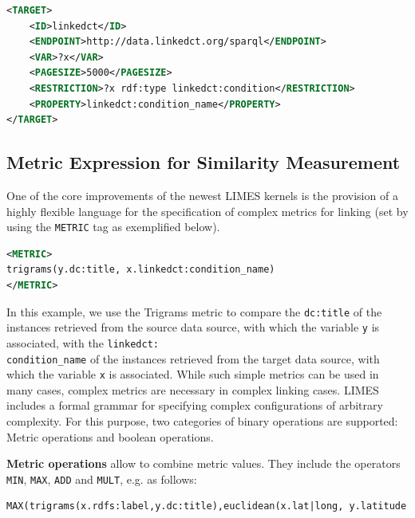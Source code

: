 \documentclass[a4paper, 11pt]{article}
\begin{document}
\begin{ttfamily}
\begin{lstlisting}[language=XML,basicstyle=\scriptsize,numberstyle=\tiny]
<TARGET>
	<ID>linkedct</ID>
	<ENDPOINT>http://data.linkedct.org/sparql</ENDPOINT>
	<VAR>?x</VAR>
	<PAGESIZE>5000</PAGESIZE>
	<RESTRICTION>?x rdf:type linkedct:condition</RESTRICTION>
	<PROPERTY>linkedct:condition_name</PROPERTY>
</TARGET>
\end{lstlisting}
\end{ttfamily}

\subsection{Metric Expression for Similarity Measurement}
One of the core improvements of the newest LIMES kernels is the provision of a highly flexible language for the specification of complex metrics for linking (set by using the \texttt{METRIC} tag as exemplified below).

\begin{ttfamily}
\begin{lstlisting}[language=XML,basicstyle=\scriptsize,numberstyle=\tiny]
<METRIC>
trigrams(y.dc:title, x.linkedct:condition_name)
</METRIC>
\end{lstlisting}
\end{ttfamily}

In this example, we use the Trigrams metric to compare the \texttt{dc:title} of the instances retrieved from the source data source, with which the variable \texttt{y} is associated, with the \texttt{linkedct:}\\\texttt{condition\_name} of the instances retrieved from the target data source, with which the variable \texttt{x} is associated. While such simple metrics can be used in many cases, complex metrics are necessary in complex linking cases. LIMES includes a formal grammar for specifying complex configurations of arbitrary complexity. For this purpose, two categories of binary operations are supported: Metric operations and boolean operations.

\textbf{Metric operations} allow to combine metric values. They include the operators \texttt{MIN}, \texttt{MAX}, \texttt{ADD} and \texttt{MULT}, e.g. as follows:

\begin{ttfamily}
\begin{lstlisting}[language=XML,basicstyle=\scriptsize,numberstyle=\tiny]
MAX(trigrams(x.rdfs:label,y.dc:title),euclidean(x.lat|long, y.latitude|longitude)).
\end{lstlisting}
\end{ttfamily}
\end{document}
